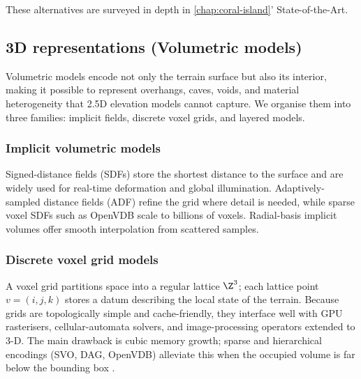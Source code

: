 These alternatives are surveyed in depth in \cref{chap:coral-island}' State-of-the-Art.

\subsection{3D representations (Volumetric models)}
Volumetric models encode not only the terrain surface but also its interior, making it possible to represent overhangs, caves, voids, and material heterogeneity that 2.5D elevation models cannot capture.
We organise them into three families: implicit fields, discrete voxel grids, and layered models.

\subsubsection{Implicit volumetric models}
    
Signed-distance fields (SDFs) store the shortest distance to the surface and are widely used for real-time deformation and global illumination. Adaptively-sampled distance fields (ADF) \cite{Frisken2000} refine the grid where detail is needed, while sparse voxel SDFs such as OpenVDB scale to billions of voxels. Radial-basis implicit volumes offer smooth interpolation from scattered samples.

\subsubsection{Discrete voxel grid models}
A voxel grid partitions space into a regular lattice $\Z^{3}$; each lattice point $v=(i,j,k)$ stores a datum describing the local state of the terrain. Because grids are topologically simple and cache-friendly, they interface well with GPU rasterisers, cellular-automata solvers, and image-processing operators extended to 3-D. The main drawback is cubic memory growth; sparse and hierarchical encodings (SVO, DAG, OpenVDB) alleviate this when the occupied volume is far below the bounding box
\cite{Laine2010,Villanueva2017,Museth2013}.

